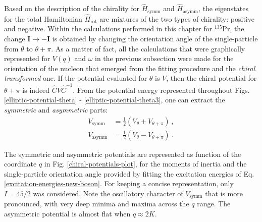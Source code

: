 Based on the description of the chirality for $\hat{H}_\text{symm}$ and $\hat{H}_\text{asymm}$, the eigenstates for the total Hamiltonian $\hat{H}_\text{rot}$ are mixtures of the two types of chirality: positive and negative. Within the calculations performed in this chapter for $^{135}$Pr, the change $\mathbf{I}\rightarrow\mathbf{-I}$ is obtained by changing the orientation angle of the single-particle from $\theta$ to $\theta+\pi$. As a matter of fact, all the calculations that were graphically represented for $V(q)$ and $\omega$ in the previous subsection were made for the orientation of the nucleon that emerged from the fitting procedure and the \emph{chiral transformed} one. If the potential evaluated for $\theta$ is $V$, then the chiral potential for $\theta+\pi$ is indeed $\hat{C}V\hat{C}^{-1}$. From the potential energy represented throughout Figs. \ref{elliptic-potential-theta} - \ref{elliptic-potential-theta3}, one can extract the \emph{symmetric} and \emph{asymmetric} parts:
\begin{align}
    V_\text{symm}&=\frac{1}{2}\left(V_\theta+V_{\theta+\pi}\right)\ , \nonumber \\
    V_\text{asymm}&=\frac{1}{2}\left(V_\theta-V_{\theta+\pi}\right)\ .
    \label{chiral-potentials-symmetric-asymmetric}
\end{align}

The symmetric and asymmetric potentials are represented as function of the coordinate $q$ in Fig. \ref{chiral-potentials-plot}, for the moments of inertia and the single-particle orientation angle provided by fitting the excitation energies of Eq. \ref{excitation-energies-new-boson}. For keeping a concise representation, only $I=45/2$ was considered. Note the oscillatory character of $V_\text{symm}$ that is more pronounced, with very deep minima and maxima across the $q$ range. The asymmetric potential is almost flat when $q\approx2K$.

